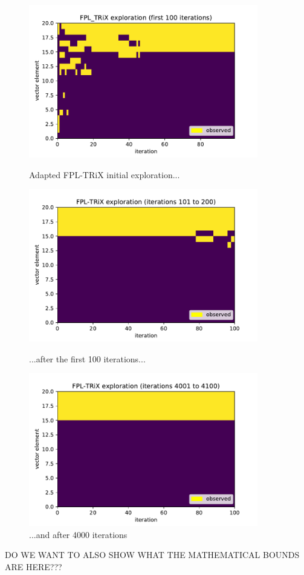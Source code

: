 \begin{figure}%
  \centering
  \includegraphics[width=10cm]{../plots/basicFPL_100iters.pdf}
  \caption{Adapted FPL-TRiX initial exploration...}
  \label{}
  \includegraphics[width=10cm]{../plots/basicFPL_100_200iters.pdf}
  \caption{...after the first 100 iterations...}
  \label{}
  \includegraphics[width=10cm]{../plots/basicFPL_4000_4100iters.pdf}
  \caption{...and after 4000 iterations}
  \label{}
\end{figure}



DO WE WANT TO ALSO SHOW WHAT THE MATHEMATICAL BOUNDS ARE HERE???

